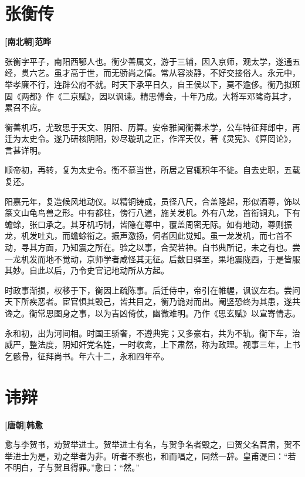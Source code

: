 \documentclass[UTF8,titlepage,oneside]{ctexbook}
\begin{document}
\chapter*{张衡传}
\begin{center}
	\textbf{[南北朝]范晔}
\end{center}

张衡字平子，南阳西鄂人也。衡少善属文，游于三辅，因入京师，观太学，遂通五经，贯六艺。虽才高于世，而无骄尚之情。常从容淡静，不好交接俗人。永元中，举孝廉不行，连辟公府不就。时天下承平日久，自王侯以下，莫不逾侈。衡乃拟班固《两都》作《二京赋》，因以讽谏。精思傅会，十年乃成。大将军邓骘奇其才，累召不应。

衡善机巧，尤致思于天文、阴阳、历算。安帝雅闻衡善术学，公车特征拜郎中，再迁为太史令。遂乃研核阴阳，妙尽璇玑之正，作浑天仪，著《灵宪》、《算罔论》，言甚详明。

顺帝初，再转，复为太史令。衡不慕当世，所居之官辄积年不徙。自去史职，五载复还。

阳嘉元年，复造候风地动仪。以精铜铸成，员径八尺，合盖隆起，形似酒尊，饰以篆文山龟鸟兽之形。中有都柱，傍行八道，施关发机。外有八龙，首衔铜丸，下有蟾蜍，张口承之。其牙机巧制，皆隐在尊中，覆盖周密无际。如有地动，尊则振龙，机发吐丸，而蟾蜍衔之。振声激扬，伺者因此觉知。虽一龙发机，而七首不动，寻其方面，乃知震之所在。验之以事，合契若神。自书典所记，未之有也。尝一龙机发而地不觉动，京师学者咸怪其无征。后数日驿至，果地震陇西，于是皆服其妙。自此以后，乃令史官记地动所从方起。

时政事渐损，权移于下，衡因上疏陈事。后迁侍中，帝引在帷幄，讽议左右。尝问天下所疾恶者。宦官惧其毁己，皆共目之，衡乃诡对而出。阉竖恐终为其患，遂共谗之。衡常思图身之事，以为吉凶倚仗，幽微难明。乃作《思玄赋》以宣寄情志。

永和初，出为河间相。时国王骄奢，不遵典宪；又多豪右，共为不轨。衡下车，治威严，整法度，阴知奸党名姓，一时收禽，上下肃然，称为政理。视事三年，上书乞骸骨，征拜尚书。年六十二，永和四年卒。


\chapter*{讳辩}
\begin{center}
	\textbf{[唐朝]韩愈}
\end{center}

愈与李贺书，劝贺举进士。贺举进士有名，与贺争名者毁之，曰贺父名晋肃，贺不举进士为是，劝之举者为非。听者不察也，和而唱之，同然一辞。皇甫湜曰：“若不明白，子与贺且得罪。”愈曰：“然。”
\end{document}
